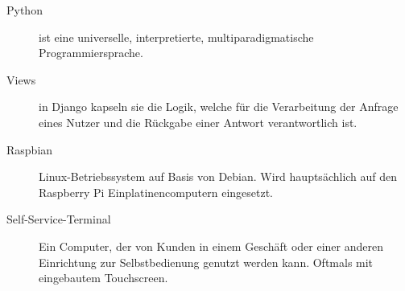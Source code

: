 \begin{description}
    \item[Python]
    ist eine universelle, interpretierte, multiparadigmatische Programmiersprache.
 
  \item[Views]
    in Django kapseln sie die Logik, welche für die Verarbeitung der Anfrage eines Nutzer und die Rückgabe einer Antwort verantwortlich ist.

  \item[Raspbian]
    Linux-Betriebssystem auf Basis von Debian. Wird hauptsächlich auf den Raspberry Pi Einplatinencomputern eingesetzt.

  \item[Self-Service-Terminal]
    Ein Computer, der von Kunden in einem Geschäft oder einer anderen Einrichtung zur Selbstbedienung genutzt werden kann. Oftmals mit eingebautem Touchscreen.
\end{description}
